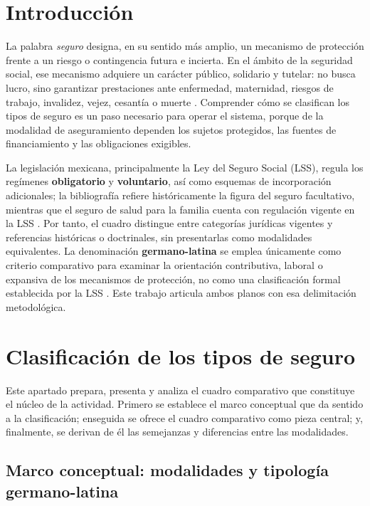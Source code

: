 \documentclass[12pt,letterpaper,oneside]{article}
\begin{document}
\section{Introducción}

La palabra \emph{seguro} designa, en su sentido más amplio, un mecanismo de protección frente a un riesgo o contingencia futura e incierta. En el ámbito de la seguridad social, ese mecanismo adquiere un carácter público, solidario y tutelar: no busca lucro, sino garantizar prestaciones ante enfermedad, maternidad, riesgos de trabajo, invalidez, vejez, cesantía o muerte \citep{bricenoRuiz2011}. Comprender cómo se clasifican los tipos de seguro es un paso necesario para operar el sistema, porque de la modalidad de aseguramiento dependen los sujetos protegidos, las fuentes de financiamiento y las obligaciones exigibles.

La legislación mexicana, principalmente la Ley del Seguro Social (LSS), regula los regímenes \textbf{obligatorio} y \textbf{voluntario}, así como esquemas de incorporación adicionales; la bibliografía refiere históricamente la figura del seguro facultativo, mientras que el seguro de salud para la familia cuenta con regulación vigente en la LSS \citep{lss2026,bricenoRuiz2011}. Por tanto, el cuadro distingue entre categorías jurídicas vigentes y referencias históricas o doctrinales, sin presentarlas como modalidades equivalentes.
La denominación \textbf{germano-latina} se emplea únicamente como criterio comparativo para examinar la orientación contributiva, laboral o expansiva de los mecanismos de protección, no como una clasificación formal establecida por la LSS \citep{bricenoRuiz2011,cotonietoMartinez2021}. Este trabajo articula ambos planos con esa delimitación metodológica.

\section{Clasificación de los tipos de seguro}

Este apartado prepara, presenta y analiza el cuadro comparativo que constituye el núcleo de la actividad. Primero se establece el marco conceptual que da sentido a la clasificación; enseguida se ofrece el cuadro comparativo como pieza central; y, finalmente, se derivan de él las semejanzas y diferencias entre las modalidades.

\subsection{Marco conceptual: modalidades y tipología germano-latina}
\end{document}
